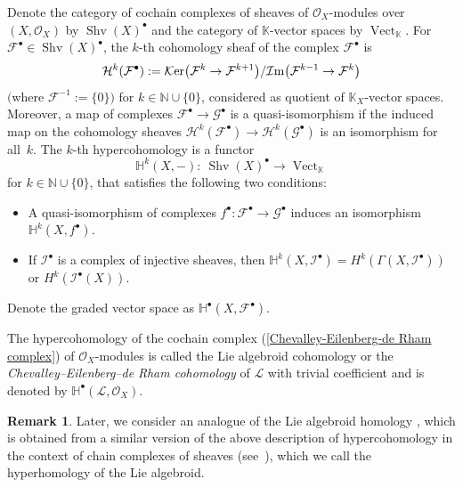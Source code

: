 \documentclass[pdftex]{sigma}
\numberwithin{equation}{section}
\theoremstyle{definition}
\newtheorem{Rem}[Thm]{Remark}
\begin{document}
Denote the category of cochain complexes of sheaves of $\mathcal{O}_X$-modules over $(X,\mathcal{O}_X)$ by $\operatorname{Shv}(X)^\bullet$ and the category of $\mathbb{K}$-vector spaces by $\operatorname{Vect}_{\mathbb{K}}$.
For $\mathcal{F}^\bullet\in \operatorname{Shv}(X)^\bullet$, the $k$-th cohomology sheaf of the complex $\mathcal{F}^\bullet$ is
\[
\mathcal{H}^k(\mathcal{F}^\bullet) := \mathcal{K}{\rm er} \bigl(\mathcal{F}^k \rightarrow \mathcal{F}^{k+1}\bigr)/{\mathcal{I}{\rm m}\bigl(\mathcal{F}^{k-1} \rightarrow \mathcal{F}^{k}\bigr)}
\]
$($where $\mathcal{F}^{-1}:=\{0\})$ for $k \in \mathbb{N} \cup \{0\}$, considered as quotient of $\mathbb{K}_X$-vector spaces.
Moreover, a map of complexes $\mathcal{F}^\bullet \rightarrow \mathcal{G}^\bullet$ is a quasi-isomorphism if the induced map on the cohomology sheaves $\mathcal{H}^k(\mathcal{F}^\bullet) \rightarrow \mathcal{H}^k(\mathcal{G}^\bullet)$ is an isomorphism for all~$k$.
The $k$-th hypercohomology is a functor
\[
\mathbb{H}^k(X,-)\colon \ \operatorname{Shv}(X)^\bullet \rightarrow \operatorname{Vect}_{\mathbb{K}}
\]
 for $k \in \mathbb{N} \cup \{0\}$, that satisfies the following two conditions:
\begin{itemize}\itemsep=0pt
	\item A quasi-isomorphism of complexes $f^\bullet\colon \mathcal{F}^\bullet \rightarrow \mathcal{G}^\bullet$ induces an isomorphism $\mathbb{H}^k(X, f^\bullet)$.
	\item
	If $\mathcal{I}^\bullet$ is a complex of injective sheaves, then $\mathbb{H}^k(X, \mathcal{I}^\bullet) = H^k(\Gamma(X, \mathcal{I}^\bullet))$ or $H^k(\mathcal{I}^\bullet (X))$.
\end{itemize}

Denote the graded vector space  as $\mathbb{H}^\bullet(X,\mathcal{F}^\bullet)$.

The hypercohomology of the cochain complex (\ref{Chevalley-Eilenberg-de Rham complex}) of $\mathcal{O}_X$-modules is called the Lie algebroid cohomology or the \emph{Chevalley--Eilenberg--de Rham cohomology} of $\mathcal{L}$ with trivial coefficient and is denoted by $\mathbb{H}^\bullet(\mathcal{L}, \mathcal{O}_X)$.

\begin{Rem} \label{hyperhomology}
Later, we consider an analogue of the Lie algebroid homology \cite{JH1, PX}, which is obtained from a similar version of the above description of hypercohomology in the context of chain complexes of sheaves (see~\cite{CW1}), which we call the hyperhomology of the Lie algebroid.
\end{Rem}
\end{document}
